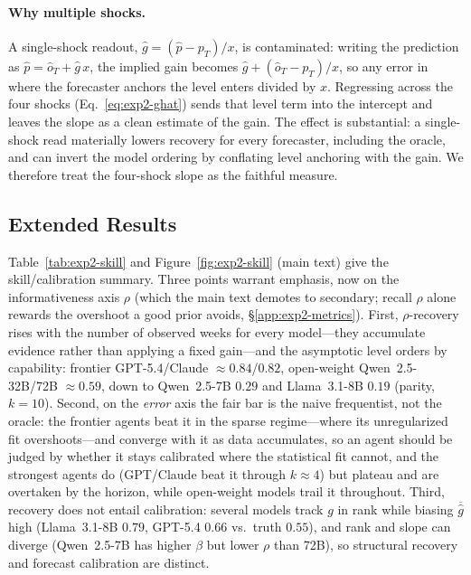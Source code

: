 \paragraph{Why multiple shocks.}  A single-shock readout, $\hat g=(\hat p-p_T)/x$, is
contaminated: writing the prediction as $\hat p = \hat o_T + \hat g\,x$, the implied gain becomes
$\hat g + (\hat o_T - p_T)/x$, so any error in where the forecaster anchors the level enters
divided by $x$.  Regressing across the four shocks (Eq.~\eqref{eq:exp2-ghat}) sends that level term
into the intercept and leaves the slope as a clean estimate of the gain.  The effect is
substantial: a single-shock read materially lowers recovery for every forecaster, including the
oracle, and can invert the model ordering by conflating level anchoring with the gain.  We therefore
treat the four-shock slope as the faithful measure.

\subsection{Extended Results}
\label{app:exp2-extended}

Table~\ref{tab:exp2-skill} and Figure~\ref{fig:exp2-skill} (main text) give the skill/calibration
summary.  Three points warrant emphasis, now on the informativeness axis $\rho$ (which the main text
demotes to secondary; recall $\rho$ alone rewards the overshoot a good prior avoids,
\S\ref{app:exp2-metrics}).  First, $\rho$-recovery rises with the number of
observed weeks for every model---they accumulate evidence rather than applying a fixed gain---and the
asymptotic level orders by capability: frontier GPT-5.4/Claude $\approx0.84$/$0.82$, open-weight
Qwen~2.5-32B/72B $\approx0.59$, down to Qwen~2.5-7B $0.29$ and Llama~3.1-8B $0.19$ (parity, $k=10$).
Second, on the \emph{error} axis the fair bar is the naive frequentist, not the oracle: the
frontier agents beat it in the sparse regime---where its unregularized fit overshoots---and converge
with it as data accumulates, so an agent should be judged by whether it stays calibrated where the
statistical fit cannot, and the strongest agents do (GPT/Claude
beat it through $k\approx4$) but plateau and are overtaken by the horizon, while open-weight models
trail it throughout.  Third,
recovery does not entail calibration: several models track $g$ in rank while biasing $\overline{\hat
g}$ high (Llama~3.1-8B $0.79$, GPT-5.4 $0.66$ vs.\ truth $0.55$), and rank and slope can diverge
(Qwen~2.5-7B has higher $\beta$ but lower $\rho$ than 72B), so structural recovery and forecast
calibration are distinct.

